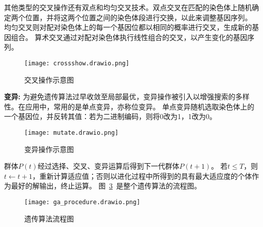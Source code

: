 其他类型的交叉操作还有双点和均匀交叉技术。双点交叉在匹配的染色体上随机确定两个位置，并将这两个位置之间的染色体段进行交换，以此来调整基因序列。
均匀交叉则对配对染色体上的每一个基因位都以相同的概率进行交叉，生成新的基因组合。
算术交叉通过对配对染色体执行线性组合的交叉，以产生变化的基因序列。
\begin{figure}[htbp]
  \centering
  \texttt{[image: crossshow.drawio.png]}
  \caption{交叉操作示意图}
  \label{fig:cross_show}
\end{figure}

\textbf{变异:}
为避免遗传算法过早收敛至局部最优，变异操作被引入以增强搜索的多样性。在应用中，常用的是单点变异，亦称位变异。
单点变异随机选取染色体上的一个基因位，并反转其值：若为二进制编码，则将0改为1，1改为0。
\begin{figure}[htbp]
  \centering
  \texttt{[image: mutate.drawio.png]}
  \caption{变异操作示意图}
  \label{fig:mutate}
\end{figure}

群体$P(t)$经过选择、交叉、变异运算后得到下一代群体$P(t+1)$。
若$t\leq T$，则 $t \leftarrow t + 1$，重新计算适应值；否则以进化过程中所得到的具有最大适应度的个体作为最好的解输出，终止运算。
图~\ref{fig:ga_procedure}~是整个遗传算法的流程图。
\begin{figure}[htbp]
  \centering
  \texttt{[image: ga\_procedure.drawio.png]}
  \caption{遗传算法流程图}
  \label{fig:ga_procedure}
\end{figure}



